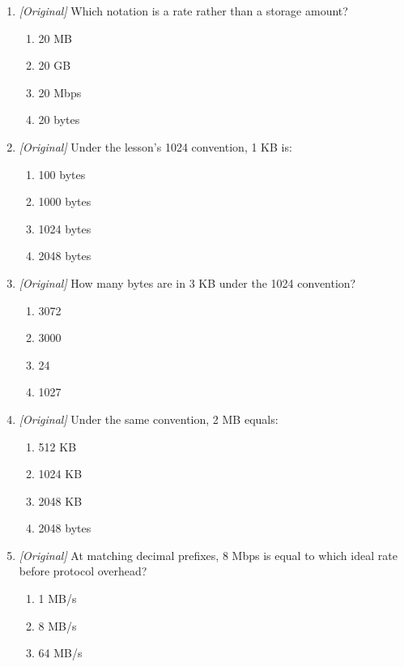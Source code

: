 \documentclass[11pt]{article}
\begin{document}
\begin{enumerate}[label=\textbf{Q\arabic*.}, leftmargin=*]
\begin{enumerate}[label=\Alph*.]
    \item Byte
    \item Bit
    \item Binary file
    \item Buffer
  \end{enumerate}
\item \textit{[Original]} Which notation is a rate rather than a storage
  amount?
  \begin{enumerate}[label=\Alph*.]
    \item 20 MB
    \item 20 GB
    \item 20 Mbps
    \item 20 bytes
  \end{enumerate}
\item \textit{[Original]} Under the lesson's 1024 convention, 1 KB is:
  \begin{enumerate}[label=\Alph*.]
    \item 100 bytes
    \item 1000 bytes
    \item 1024 bytes
    \item 2048 bytes
  \end{enumerate}
\item \textit{[Original]} How many bytes are in 3 KB under the 1024
  convention?
  \begin{enumerate}[label=\Alph*.]
    \item 3072
    \item 3000
    \item 24
    \item 1027
  \end{enumerate}
\item \textit{[Original]} Under the same convention, 2 MB equals:
  \begin{enumerate}[label=\Alph*.]
    \item 512 KB
    \item 1024 KB
    \item 2048 KB
    \item 2048 bytes
  \end{enumerate}
\item \textit{[Original]} At matching decimal prefixes, 8 Mbps is equal to
  which ideal rate before protocol overhead?
  \begin{enumerate}[label=\Alph*.]
    \item 1 MB/s
    \item 8 MB/s
    \item 64 MB/s

\end{enumerate}
\end{enumerate}
\end{document}
